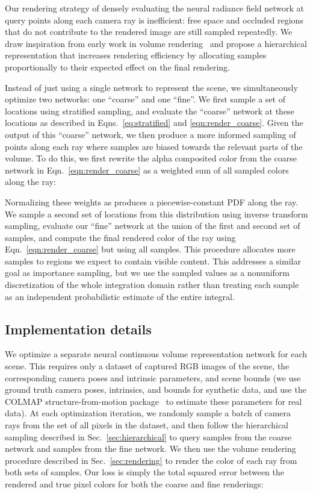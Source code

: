 \documentclass[runningheads]{llncs}
\begin{document}
Our rendering strategy of densely evaluating the neural radiance field network at  query points along each camera ray is inefficient: free space and occluded regions that do not contribute to the rendered image are still sampled repeatedly.
We draw inspiration from early work in volume rendering~\cite{levoy90} and propose a hierarchical representation that increases rendering efficiency by allocating samples proportionally to their expected effect on the final rendering.

Instead of just using a single network to represent the scene, we simultaneously optimize two networks: one ``coarse'' and one ``fine''.
We first sample a set of  locations using stratified sampling, and evaluate the ``coarse'' network at these locations as described in Eqns.~\ref{eq:stratified} and \ref{eqn:render_coarse}. Given the output of this ``coarse'' network, we then produce a more informed sampling of points along each ray where samples are biased towards the relevant parts of the volume. To do this, we first rewrite the alpha composited color from the coarse network  in Eqn.~\ref{eqn:render_coarse} as a weighted sum of all sampled colors  along the ray:

Normalizing these weights as  produces a piecewise-constant PDF along the ray.
We sample a second set of  locations from this distribution using inverse transform sampling, evaluate our ``fine'' network at the union of the first and second set of samples, and compute the final rendered color of the ray  using Eqn.~\ref{eqn:render_coarse} but using all  samples. This procedure allocates more samples to regions we expect to contain visible content. This addresses a similar goal as importance sampling, but we use the sampled values as a nonuniform discretization of the whole integration domain rather than treating each sample as an independent probabilistic estimate of the entire integral.

\subsection{Implementation details}

We optimize a separate neural continuous volume representation network for each scene. This requires only a dataset of captured RGB images of the scene, the corresponding camera poses and intrinsic parameters, and scene bounds (we use ground truth camera poses, intrinsics, and bounds for synthetic data, and use the COLMAP structure-from-motion package~\cite{colmap} to estimate these parameters for real data). At each optimization iteration, we randomly sample a batch of camera rays from the set of all pixels in the dataset, and then follow the hierarchical sampling described in Sec.~\ref{sec:hierarchical} to query  samples from the coarse network and  samples from the fine network. We then use the volume rendering procedure described in Sec.~\ref{sec:rendering} to render the color of each ray from both sets of samples. Our loss is simply the total squared error between the rendered and true pixel colors for both the coarse and fine renderings:
\end{document}
